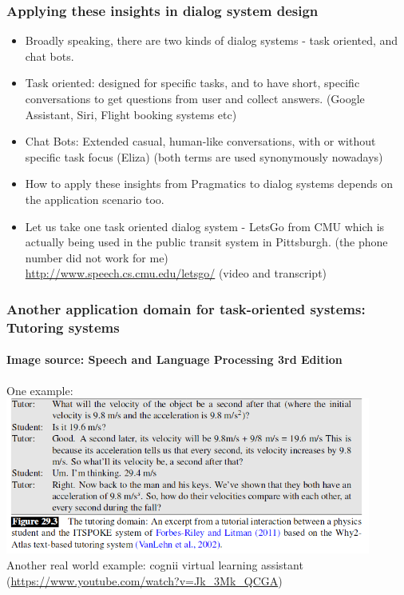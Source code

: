\documentclass{beamer}
\begin{document}
\begin{frame}
\frametitle{Applying these insights in dialog system design}
\begin{itemize}
\item Broadly speaking, there are two kinds of dialog systems - task oriented, and chat bots.
\item Task oriented: designed for specific tasks, and to have short, specific conversations to get questions from user and collect answers. (Google Assistant, Siri, Flight booking systems etc)
\item Chat Bots: Extended casual, human-like conversations, with or without specific task focus (Eliza) \pause (both terms are used synonymously nowadays)
\item How to apply these insights from Pragmatics to dialog systems depends on the application scenario too. \pause
\item Let us take one task oriented dialog system - LetsGo from CMU which is actually being used in the public transit system in Pittsburgh. (the phone number did not work for me)
\\ \url{http://www.speech.cs.cmu.edu/letsgo/} (video and transcript)
\end{itemize}
\end{frame}

\begin{frame}
\frametitle{Another application domain for task-oriented systems: Tutoring systems}
\framesubtitle{Image source: Speech and Language Processing 3rd Edition}
One example: 
\includegraphics[width=0.9\textwidth]{tutoringdialog.png}
\\ \pause Another real world example: cognii virtual learning assistant (\url{https://www.youtube.com/watch?v=Jk_3Mk_QCGA})
\end{frame}
\end{document}
